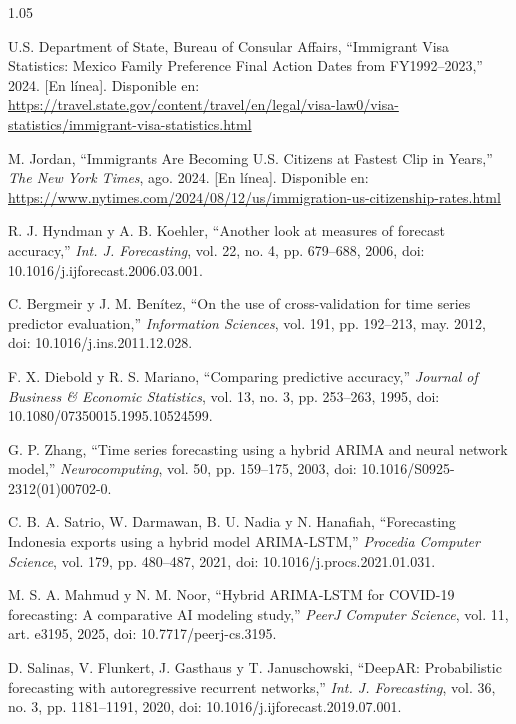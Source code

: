 \documentclass[12pt,letterpaper]{report}
\begin{document}
\begin{spacing}{1.05}
\begin{enumerate}[label={[\arabic*]}, leftmargin=0.9cm, labelsep=0.3cm, itemsep=4pt, parsep=0pt, topsep=0pt]
    \item \label{bib:14} U.S. Department of State, Bureau of Consular Affairs, ``Immigrant Visa Statistics: Mexico Family Preference Final Action Dates from FY1992--2023,'' 2024. [En línea]. Disponible en: \url{https://travel.state.gov/content/travel/en/legal/visa-law0/visa-statistics/immigrant-visa-statistics.html}

    \item \label{bib:15} M. Jordan, ``Immigrants Are Becoming U.S. Citizens at Fastest Clip in Years,'' \textit{The New York Times}, ago. 2024. [En línea]. Disponible en: \url{https://www.nytimes.com/2024/08/12/us/immigration-us-citizenship-rates.html}

    \item \label{bib:16} R. J. Hyndman y A. B. Koehler, ``Another look at measures of forecast accuracy,'' \textit{Int. J. Forecasting}, vol. 22, no. 4, pp. 679--688, 2006, doi: 10.1016/j.ijforecast.2006.03.001.

    \item \label{bib:17} C. Bergmeir y J. M. Benítez, ``On the use of cross-validation for time series predictor evaluation,'' \textit{Information Sciences}, vol. 191, pp. 192--213, may. 2012, doi: 10.1016/j.ins.2011.12.028.

    \item \label{bib:18} F. X. Diebold y R. S. Mariano, ``Comparing predictive accuracy,'' \textit{Journal of Business \& Economic Statistics}, vol. 13, no. 3, pp. 253--263, 1995, doi: 10.1080/07350015.1995.10524599.

    \item \label{bib:19} G. P. Zhang, ``Time series forecasting using a hybrid ARIMA and neural network model,'' \textit{Neurocomputing}, vol. 50, pp. 159--175, 2003, doi: 10.1016/S0925-2312(01)00702-0.

    \item \label{bib:20} C. B. A. Satrio, W. Darmawan, B. U. Nadia y N. Hanafiah, ``Forecasting Indonesia exports using a hybrid model ARIMA-LSTM,'' \textit{Procedia Computer Science}, vol. 179, pp. 480--487, 2021, doi: 10.1016/j.procs.2021.01.031.

    \item \label{bib:21} M. S. A. Mahmud y N. M. Noor, ``Hybrid ARIMA-LSTM for COVID-19 forecasting: A comparative AI modeling study,'' \textit{PeerJ Computer Science}, vol. 11, art. e3195, 2025, doi: 10.7717/peerj-cs.3195.

    \item \label{bib:22} D. Salinas, V. Flunkert, J. Gasthaus y T. Januschowski, ``DeepAR: Probabilistic forecasting with autoregressive recurrent networks,'' \textit{Int. J. Forecasting}, vol. 36, no. 3, pp. 1181--1191, 2020, doi: 10.1016/j.ijforecast.2019.07.001.


\end{enumerate}
\end{spacing}
\end{document}
